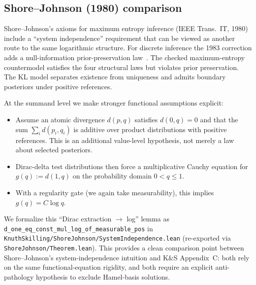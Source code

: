 \documentclass[11pt]{article}
\theoremstyle{definition}
\theoremstyle{remark}
\begin{document}
\subsection{Shore--Johnson (1980) comparison}

Shore--Johnson's axioms for maximum entropy inference (IEEE Trans.\ IT, 1980) include a ``system independence''
requirement that can be viewed as another route to the same logarithmic structure.
For discrete inference the 1983 correction adds a null-information prior-preservation
law~\cite{JohnsonShore1983}. The checked maximum-entropy countermodel satisfies the
four structural laws but violates prior preservation. The KL model separates
existence from uniqueness and admits boundary posteriors under positive references.

At the summand level we make stronger functional assumptions explicit:

\begin{itemize}
\item Assume an atomic divergence $d(p,q)$ satisfies $d(0,q)=0$ and that the sum
  $\sum_i d(p_i,q_i)$ is additive over product distributions with positive references. This is an additional value-level hypothesis, not merely a law about selected posteriors.
\item Dirac-delta test distributions then force a multiplicative Cauchy equation for
  $g(q) := d(1,q)$ on the probability domain $0<q\le 1$.
\item With a regularity gate (we again take measurability), this implies $g(q)=C\log q$.
\end{itemize}

We formalize this ``Dirac extraction $\to$ log'' lemma as
\texttt{d\_one\_eq\_const\_mul\_log\_of\_measurable\_pos}
in \texttt{KnuthSkilling/ShoreJohnson/SystemIndependence.lean} (re-exported via \texttt{ShoreJohnson/Theorem.lean}).
This provides a clean comparison point between Shore--Johnson's system-independence intuition and
K\&S Appendix~C: both rely on the same functional-equation rigidity, and both require an explicit
anti-pathology hypothesis to exclude Hamel-basis solutions.
\end{document}
